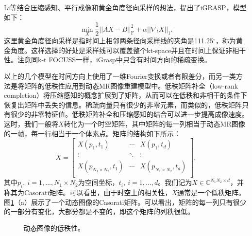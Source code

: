 Li等结合压缩感知、平行成像和黄金角度径向采样的想法，提出了iGRASP\cite{igrasp}，模型如下：
\begin{equation}
	\min_X\frac{1}{2}||AX-B||_\mathrm{F}^2+\alpha||\nabla_t X||_1.
\end{equation}
这里黄金角度径向采样是指时间上相邻两条径向采样线的夹角是111.25$^{\circ}$，称为黄金角度。这样选择的好处是采样线可以覆盖整个kt-space并且在时间上保证非相干性。注意同k-t FOCUSS一样，iGrasp中只含有时间方向的稀疏变换。

以上的几个模型在时间方向上使用了一维Fourier变换或者有限差分，而另一类方法是将矩阵的低秩性应用到动态MR图像重建模型中。低秩矩阵补全\cite{candes2009exact}（low-rank completion）将压缩感知的概念扩展到了矩阵，从而可以在低秩和非相干的条件下恢复出矩阵中丢失的信息。稀疏向量只有很少的非零元素，而类似的，低秩矩阵只有很少的非零特征值。低秩矩阵补全和压缩感知的结合可以进一步提高成像速度。这时，我们一般将$X$转化为一个时空矩阵，其中矩阵的每一列相当于动态MR图像的一帧，每一行相当于一个体素点。矩阵的结构如下所示：
\begin{equation}
X = 
\left[              
  \begin{array}{ccc}   
    X(p_1,t_1) & \cdots & X(p_1,t_{d})\\ 
    \vdots &\ddots & \vdots\\
    X(p_{N_1\times N_2},t_1) & \cdots & X(p_{N_1\times N_2},t_{d})\\  
  \end{array}
\right],                 
\end{equation}
其中$p_i,\ i=1,...,N_1\times N_2$为空间坐标，$t_i,\ i=1,...,d$。我们记为$X\in \mathbb{C}^{N_1N_2\times d}$，并称其为Casorati矩阵。可以看出，由于时空上的相关性，$X$通常是一个低秩矩阵。图\ref{fig:lowrank}（a）展示了一个动态图像的Casorati矩阵。可以看出，矩阵的每一列只有很少的一部分有变化，大部分都是不变的，即这个矩阵的列秩很低。
\begin{figure}[htbp]
\centering
{}
\centering
\caption{动态图像的低秩性。}
\label{fig:lowrank}
\end{figure}

